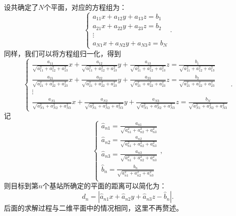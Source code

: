 设共确定了\( N \)个平面，对应的方程组为：
\[
    \begin{cases}
        a_{11} x + a_{12} y + a_{13} z = b_1 \\
        a_{21} x + a_{22} y + a_{23} z = b_2 \\
        \vdots                               \\
        a_{N1} x + a_{N2} y + a_{N3} z = b_N
    \end{cases}.
\]
同样，我们可以将方程组归一化，得到
\[
    \begin{cases}
        \frac{a_{11}}{\sqrt{a_{11}^2 + a_{12}^2 + a_{13}^2}} x + \frac{a_{12}}{\sqrt{a_{11}^2 + a_{12}^2 + a_{13}^2}} y + \frac{a_{13}}{\sqrt{a_{11}^2 + a_{12}^2 + a_{13}^2}} z = \frac{b_1}{\sqrt{a_{11}^2 + a_{12}^2 + a_{13}^2}} \\
        \frac{a_{21}}{\sqrt{a_{21}^2 + a_{22}^2 + a_{23}^2}} x + \frac{a_{22}}{\sqrt{a_{21}^2 + a_{22}^2 + a_{23}^2}} y + \frac{a_{23}}{\sqrt{a_{21}^2 + a_{22}^2 + a_{23}^2}} z = \frac{b_2}{\sqrt{a_{21}^2 + a_{22}^2 + a_{23}^2}} \\
        \vdots                                                                                                                                                                                                                       \\
        \frac{a_{N1}}{\sqrt{a_{N1}^2 + a_{N2}^2 + a_{N3}^2}} x + \frac{a_{N2}}{\sqrt{a_{N1}^2 + a_{N2}^2 + a_{N3}^2}} y + \frac{a_{N3}}{\sqrt{a_{N1}^2 + a_{N2}^2 + a_{N3}^2}} z = \frac{b_N}{\sqrt{a_{N1}^2 + a_{N2}^2 + a_{N3}^2}}
    \end{cases}.
\]
记
\[
    \begin{cases}
        \hat{a}_{n1} = \frac{a_{n1}}{\sqrt{a_{n1}^2 + a_{n2}^2 + a_{n3}^2}} \\
        \hat{a}_{n2} = \frac{a_{n2}}{\sqrt{a_{n1}^2 + a_{n2}^2 + a_{n3}^2}} \\
        \hat{a}_{n3} = \frac{a_{n3}}{\sqrt{a_{n1}^2 + a_{n2}^2 + a_{n3}^2}} \\
        \hat{b}_n = \frac{b_n}{\sqrt{a_{n1}^2 + a_{n2}^2 + a_{n3}^2}}       \\
    \end{cases},
\]
则目标到第\( n \)个基站所确定的平面的距离可以简化为：
\[
    d_n = |\hat{a}_{n1} x + \hat{a}_{n2} y + \hat{a}_{n3} z - \hat{b}_n|.
\]
后面的求解过程与二维平面中的情况相同，这里不再赘述。

